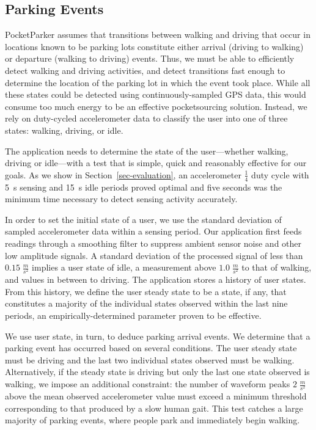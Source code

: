 \subsection{Parking Events}
\label{subsec-goals}

PocketParker assumes that transitions between walking and driving that occur
in locations known to be parking lots constitute either arrival (driving to
walking) or departure (walking to driving) events. Thus, we must be able to
efficiently detect walking and driving activities, and detect transitions
fast enough to determine the location of the parking lot in which the event
took place. While all these states could be detected using
continuously-sampled GPS data, this would consume too much energy to be an
effective pocketsourcing solution. Instead, we rely on duty-cycled
accelerometer data to classify the user into one of three states: walking,
driving, or idle.

The application needs to determine the state of the user---whether walking,
driving or idle---with a test that is simple, quick and reasonably effective
for our goals. As we show in Section~\ref{sec-evaluation}, an accelerometer
$\frac{1}{4}$ duty cycle with 5~s sensing and 15~s idle periods proved
optimal and five seconds was the minimum time necessary to detect sensing
activity accurately.

In order to set the initial state of a user, we use the standard deviation of
sampled accelerometer data within a sensing period. Our application first
feeds readings through a smoothing filter to suppress ambient sensor noise
and other low amplitude signals. A standard deviation of the processed signal
of less than $0.15\;\frac{m}{s^2}$ implies a user state of idle, a
measurement above $1.0\;\frac{m}{s^2}$ to that of walking, and values in
between to driving. The application stores a history of user states. From
this history, we define the user steady state to be a state, if any, that
constitutes a majority of the individual states observed within the last nine
periods, an empirically-determined parameter proven to be effective.

We use user state, in turn, to deduce parking arrival events. We determine
that a parking event has occurred based on several conditions. The user
steady state must be driving and the last two individual states observed must
be walking. Alternatively, if the steady state is driving but only the last
one state observed is walking, we impose an additional constraint: the number
of waveform peaks $2\;\frac{m}{s^2}$ above the mean observed accelerometer
value must exceed a minimum threshold corresponding to that produced by a
slow human gait.  This test catches a large majority of parking events, where
people park and immediately begin walking.

